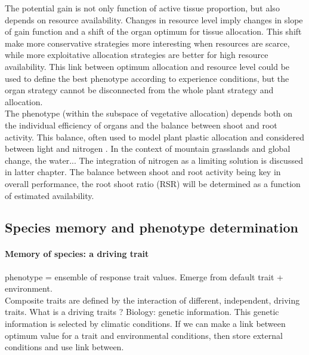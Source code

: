 The potential gain is not only function of active tissue proportion, but also depends on resource availability. Changes in resource level imply changes in slope of gain function and a shift of the organ optimum for tissue allocation. This shift make more conservative strategies more interesting when resources are scarce, while more exploitative allocation strategies are better for high resource availability. This link between optimum allocation and resource level could be used to define the best phenotype according to experience conditions, but the organ strategy cannot be disconnected from the whole plant strategy and allocation.\\

The phenotype (within the subspace of vegetative allocation) depends both on the individual efficiency of organs and the balance between shoot and root activity. This balance, often used to model plant plastic allocation and considered between light and nitrogen \cite{lohier, soussana}. In the context of mountain grasslands and global change, the water... The integration of nitrogen as a limiting solution is discussed in latter chapter. The balance between shoot and root activity being key in overall performance, the root shoot ratio (RSR) will be determined as a function of estimated availability. 

\subsection{Species memory and phenotype determination}

\paragraph{Memory of species: a driving trait}

phenotype = ensemble of response trait values. Emerge from default trait + environment.\\
Composite traits are defined by the interaction of different, independent, driving traits. What is a driving traits ? Biology: genetic information. This genetic information is selected by climatic conditions. If we can make a link between optimum value for a trait and environmental conditions, then store external conditions and use link between.\\




